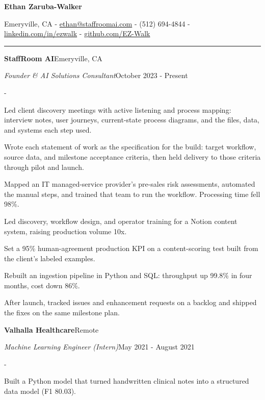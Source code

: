 \documentclass[10pt,letterpaper]{article}
\newenvironment{cvitems}{%
  \begin{list}{-}{%
    \setlength{\leftmargin}{12pt}%
    \setlength{\itemsep}{1.2pt}%
    \setlength{\parsep}{0pt}%
    \setlength{\topsep}{1.5pt}%
    \setlength{\partopsep}{0pt}%
    \setlength{\labelwidth}{6pt}%
    \setlength{\labelsep}{6pt}%
    \setlength{\itemindent}{0pt}%
  }%
}{\end{list}}
\newcommand{\cvsection}[1]{%
  \vspace{7pt}%
  \noindent{\bfseries\fontsize{11pt}{13pt}\selectfont\MakeUppercase{#1}}\par
  \vspace{1pt}%
  \noindent\rule{\textwidth}{0.4pt}\par
  \vspace{4pt}%
}
\newcommand{\cventryhead}[4]{%
  \noindent\textbf{#1}\hfill#2\par
  \vspace{0.5pt}%
  \noindent\textit{#3}\hfill#4\par
}
\begin{document}
\begin{center}
  {\bfseries\fontsize{22pt}{24pt}\selectfont Ethan Zaruba-Walker\par}
  \vspace{4pt}
  {\fontsize{10pt}{12pt}\selectfont
    Emeryville, CA
    {-}
    \href{mailto:ethan@staffroomai.com}{ethan@staffroomai.com}
    {-}
    (512) 694-4844
    {-}
    \href{https://linkedin.com/in/ezwalk}{linkedin.com/in/ezwalk}
    {-}
    \href{https://github.com/EZ-Walk}{github.com/EZ-Walk}\par}
\end{center}
\vspace{2pt}

\cvsection{Experience}

\cventryhead{StaffRoom AI}{Emeryville, CA}
{Founder \& AI Solutions Consultant}{October 2023 - Present}
\begin{cvitems}
  \item Led client discovery meetings with active listening and process mapping: interview notes, user journeys, current-state process diagrams, and the files, data, and systems each step used.
  \item Wrote each statement of work as the specification for the build: target workflow, source data, and milestone acceptance criteria, then held delivery to those criteria through pilot and launch.
  \item Mapped an IT managed-service provider's pre-sales risk assessments, automated the manual steps, and trained that team to run the workflow. Processing time fell 98\%.
  \item Led discovery, workflow design, and operator training for a Notion content system, raising production volume 10x.
  \item Set a 95\% human-agreement production KPI on a content-scoring test built from the client's labeled examples.
  \item Rebuilt an ingestion pipeline in Python and SQL: throughput up 99.8\% in four months, cost down 86\%.
  \item After launch, tracked issues and enhancement requests on a backlog and shipped the fixes on the same milestone plan.
\end{cvitems}

\vspace{3pt}
\cventryhead{Valhalla Healthcare}{Remote}
{Machine Learning Engineer (Intern)}{May 2021 - August 2021}
\begin{cvitems}
  \item Built a Python model that turned handwritten clinical notes into a structured data model (F1 80.03).
\end{cvitems}
\end{document}
